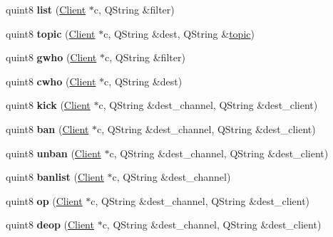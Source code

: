 \begin{DoxyCompactItemize}
\item 
\hypertarget{class_server_a930fafaa2dd67c9ec396fcc0d4f90f23}{quint8 {\bfseries list} (\hyperlink{class_client}{Client} $\ast$c, Q\-String \&filter)}\label{class_server_a930fafaa2dd67c9ec396fcc0d4f90f23}

\item 
\hypertarget{class_server_a5871d3b0bba590d2d4d5e2b4f658e97f}{quint8 {\bfseries topic} (\hyperlink{class_client}{Client} $\ast$c, Q\-String \&dest, Q\-String \&\hyperlink{classtopic}{topic})}\label{class_server_a5871d3b0bba590d2d4d5e2b4f658e97f}

\item 
\hypertarget{class_server_aa169501040e47da0c402e945d6ed2658}{quint8 {\bfseries gwho} (\hyperlink{class_client}{Client} $\ast$c, Q\-String \&filter)}\label{class_server_aa169501040e47da0c402e945d6ed2658}

\item 
\hypertarget{class_server_a7eeab62acbd32844092b8ebde87b1f59}{quint8 {\bfseries cwho} (\hyperlink{class_client}{Client} $\ast$c, Q\-String \&dest)}\label{class_server_a7eeab62acbd32844092b8ebde87b1f59}

\item 
\hypertarget{class_server_a582b1c43b2203842556f027e24c5ab14}{quint8 {\bfseries kick} (\hyperlink{class_client}{Client} $\ast$c, Q\-String \&dest\-\_\-channel, Q\-String \&dest\-\_\-client)}\label{class_server_a582b1c43b2203842556f027e24c5ab14}

\item 
\hypertarget{class_server_ac535983e5b7385000dc393c39d14858d}{quint8 {\bfseries ban} (\hyperlink{class_client}{Client} $\ast$c, Q\-String \&dest\-\_\-channel, Q\-String \&dest\-\_\-client)}\label{class_server_ac535983e5b7385000dc393c39d14858d}

\item 
\hypertarget{class_server_a7c71f99bf244c49033fe900e03ad63e0}{quint8 {\bfseries unban} (\hyperlink{class_client}{Client} $\ast$c, Q\-String \&dest\-\_\-channel, Q\-String \&dest\-\_\-client)}\label{class_server_a7c71f99bf244c49033fe900e03ad63e0}

\item 
\hypertarget{class_server_ac62912fe43e8a654577b966968cdfce2}{quint8 {\bfseries banlist} (\hyperlink{class_client}{Client} $\ast$c, Q\-String \&dest\-\_\-channel)}\label{class_server_ac62912fe43e8a654577b966968cdfce2}

\item 
\hypertarget{class_server_a7b1d97bd8e92e8304dcd97087784adf6}{quint8 {\bfseries op} (\hyperlink{class_client}{Client} $\ast$c, Q\-String \&dest\-\_\-channel, Q\-String \&dest\-\_\-client)}\label{class_server_a7b1d97bd8e92e8304dcd97087784adf6}

\item 
\hypertarget{class_server_a19104090a1379769df2cb2d15ba7b583}{quint8 {\bfseries deop} (\hyperlink{class_client}{Client} $\ast$c, Q\-String \&dest\-\_\-channel, Q\-String \&dest\-\_\-client)}\label{class_server_a19104090a1379769df2cb2d15ba7b583}

\end{DoxyCompactItemize}
